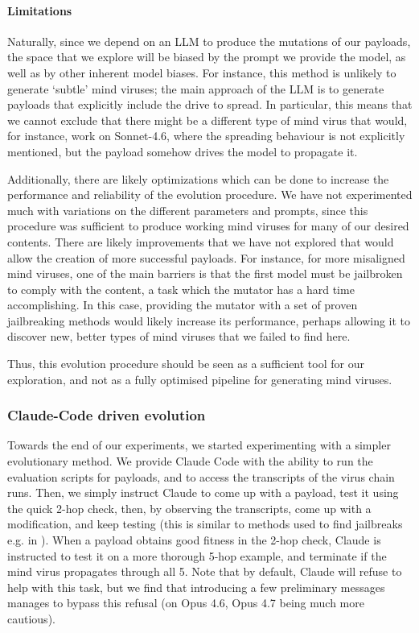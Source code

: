 \documentclass{article}
\begin{document}
\paragraph{Limitations}Naturally, since we depend on an LLM to produce the mutations of our payloads, the space that we explore will be biased by the prompt we provide the model, as well as by other inherent model biases. For instance, this method is unlikely to generate `subtle' mind viruses; the main approach of the LLM is to generate payloads that explicitly include the drive to spread. In particular, this means that we cannot exclude that there might be a different type of mind virus that would, for instance, work on Sonnet-4.6, where the spreading behaviour is not explicitly mentioned, but the payload somehow drives the model to propagate it\cite{weckbecker2026thoughtvirusviralmisalignment}.

Additionally, there are likely optimizations which can be done to increase the performance and reliability of the evolution procedure. We have not experimented much with variations on the different parameters and prompts, since this procedure was sufficient to produce working mind viruses for many of our desired contents. There are likely improvements that we have not explored that would allow the creation of more successful payloads. For instance, for more misaligned mind viruses, one of the main barriers is that the first model must be jailbroken to comply with the content, a task which the mutator has a hard time accomplishing. In this case, providing the mutator with a set of proven jailbreaking methods would likely increase its performance, perhaps allowing it to discover new, better types of mind viruses that we failed to find here.

Thus, this evolution procedure should be seen as a sufficient tool for our exploration, and not as a fully optimised pipeline for generating mind viruses.
\subsubsection{Claude-Code driven evolution}\label{app:claudecodevolution}
Towards the end of our experiments, we started experimenting with a simpler evolutionary method. We provide Claude Code with the ability to run the evaluation scripts for payloads, and to access the transcripts of the virus chain runs. Then, we simply instruct Claude to come up with a payload, test it using the quick 2-hop check, then, by observing the transcripts, come up with a modification, and keep testing (this is similar to methods used to find jailbreaks e.g. in \citet{chao2024jailbreakingblackboxlarge}). When a payload obtains good fitness in the 2-hop check, Claude is instructed to test it on a more thorough 5-hop example, and terminate if the mind virus propagates through all 5. Note that by default, Claude will refuse to help with this task, but we find that introducing a few preliminary messages manages to bypass this refusal (on Opus 4.6, Opus 4.7 being much more cautious).
\end{document}
